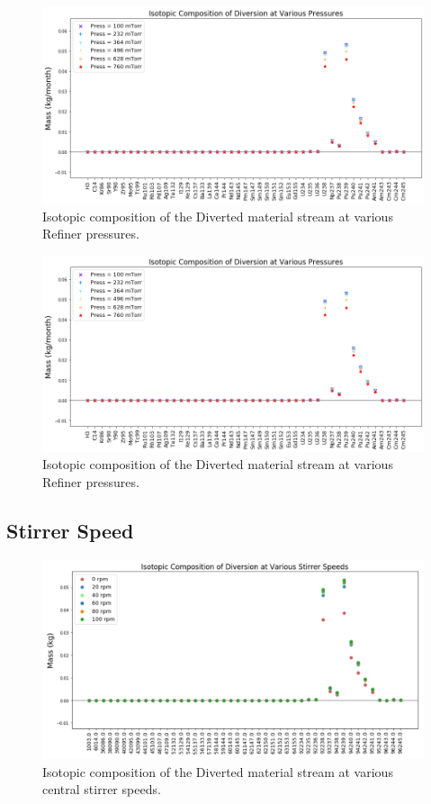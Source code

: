 \begin{figure}
	\includegraphics[width=\linewidth]{images/pressure-sa-comp}
	\caption{Isotopic composition of the Diverted material stream at various Refiner pressures.}
	\label{fig:ref-press-sa}
\end{figure}

\begin{figure}
	\includegraphics[width=\linewidth]{images/pressure-sa-comp}
	\caption{Isotopic composition of the Diverted material stream at various Refiner pressures.}
	\label{fig:ref-press-diff}
\end{figure}

\subsection{Stirrer Speed}

\begin{figure}
	\includegraphics[width=\linewidth]{images/ref-rot-comp}
	\caption{Isotopic composition of the Diverted material stream at various central stirrer speeds.}
	\label{fig:ref-rot-sa}
\end{figure}

